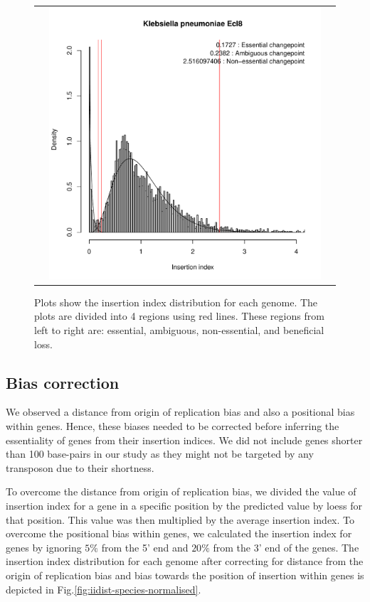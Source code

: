 \documentclass[12pt,letterpaper]{article}
\begin{document}
\begin{figure}
\begin{tabular}{c c c}
&\includegraphics[page=13, scale=0.25]{essentiality.pdf}&\\
\end{tabular}
\caption{Plots show the insertion index distribution for each genome. The plots are divided into 4 regions using red lines. These regions from left to right are: essential, ambiguous, non-essential, and beneficial loss.}
\label{fig:iidist-species}
\end{figure}

\subsection{Bias correction}\label{sec:biascorrection}
We observed a distance from origin of replication bias and also a positional bias within genes. Hence, these biases needed to be corrected before inferring the essentiality of genes from their insertion indices. We did not include genes shorter than 100 base-pairs in our study as they might not be targeted by any transposon due to their shortness. 

To overcome the distance from origin of replication bias, we divided the value of insertion index for a gene in a specific position by the predicted value by loess for that position. This value was then multiplied by the average insertion index. To overcome the positional bias within genes, we calculated the insertion index for genes by ignoring $5\%$ from the 5' end and $20\%$ from the 3' end of the genes. The insertion index distribution for each genome after correcting for distance from the origin of replication bias and bias towards the position of insertion within genes is depicted in Fig.\@ \ref{fig:iidist-species-normalised}.
\end{document}
